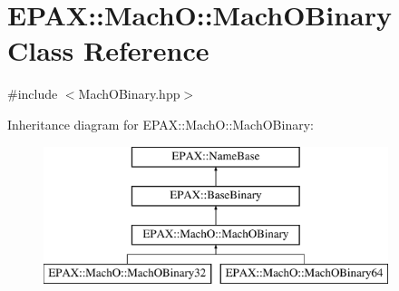 \hypertarget{class_e_p_a_x_1_1_mach_o_1_1_mach_o_binary}{\section{\-E\-P\-A\-X\-:\-:\-Mach\-O\-:\-:\-Mach\-O\-Binary \-Class \-Reference}
\label{class_e_p_a_x_1_1_mach_o_1_1_mach_o_binary}
}


{\ttfamily \#include $<$\-Mach\-O\-Binary.\-hpp$>$}

\-Inheritance diagram for \-E\-P\-A\-X\-:\-:\-Mach\-O\-:\-:\-Mach\-O\-Binary\-:\begin{figure}[H]
\begin{center}
\leavevmode
\includegraphics[height=4.000000cm]{class_e_p_a_x_1_1_mach_o_1_1_mach_o_binary}
\end{center}
\end{figure}
